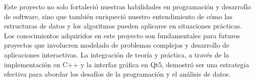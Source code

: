 \documentclass[conference]{IEEEtran}
\begin{document}
Este proyecto no solo fortaleció nuestras habilidades en programación y desarrollo de software, sino que también enriqueció nuestro entendimiento de cómo las estructuras de datos y los algoritmos pueden aplicarse en situaciones prácticas. Los conocimientos adquiridos en este proyecto son fundamentales para futuros proyectos que involucren modelado de problemas complejos y desarrollo de aplicaciones interactivas. La integración de teoría y práctica, a través de la implementación en C++ y la interfaz gráfica en Qt5, demostró ser una estrategia efectiva para abordar los desafíos de la programación y el análisis de datos.



\printbibliography
\end{document}
